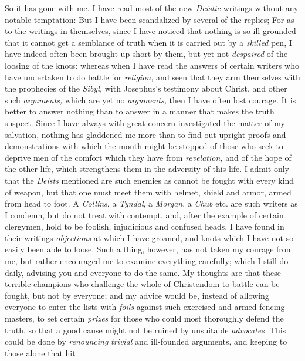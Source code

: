 \documentclass[12pt,a4paper,openany]{book}
\newcommand{\opage}[1]{\marginnote{\footnotesize\textit{[#1]}}}
\begin{document}
So it has gone with me. I have read most of the new \textit{Deistic} writings
without any notable temptation: But I have been scandalized by several of the
replies; For as to the writings in themselves, since I have noticed that nothing
is so ill-grounded that it cannot get a semblance of truth when it is carried
out by a \textit{skilled} pen, I have indeed often been brought up short by them,
but yet not \textit{despaired} of the loosing of the knots: whereas when I have
read the answers of certain writers who have undertaken to do battle for
\textit{religion,} and seen that they arm themselves with the prophecies of the
\textit{Sibyl,} with Josephus's testimony about Christ, and other such
\textit{arguments,} which are yet no \textit{arguments,} then I have often lost
courage. It is better to answer nothing than to answer in a manner that makes
the truth suspect. Since I have always with great concern investigated the matter
of my salvation, nothing has gladdened me more than to find out upright proofs
and demonstrations with which the mouth might be stopped of those who seek to
deprive men of the comfort which they have from \textit{revelation,} and of the
hope of the other life, which strengthens them in the adversity of this life. I
admit only that the \textit{Deists} mentioned are such enemies as cannot be
fought with every kind of weapon, but that one must meet them with helmet,
shield and armor, armed from head to foot. A \textit{Collins}, a
\textit{Tyndal}, a \textit{Morgan}, a \textit{Chub} etc. are such writers as I
condemn, but do not treat with contempt, and, after the example of certain
clergymen, hold to be foolish, injudicious and confused heads. I have found in
their writings \textit{objections} at which I have groaned, and knots which I
have not so easily been able to loose. Such a thing, however, has not
\setcounter{footnote}{0}%
\opage{12}taken my courage from me, but rather encouraged me to examine everything
carefully; which I still do daily, advising you and everyone to do the same. My
thoughts are that these terrible champions who challenge the whole of
Christendom to battle can be fought, but not by everyone; and my advice would be,
instead of allowing everyone to enter the lists with \textit{foils} against such
exercised and armed fencing-masters, to set certain \textit{prizes} for those who
could most thoroughly defend the truth, so that a good cause might not be ruined
by unsuitable \textit{advocates.} This could be done by \textit{renouncing}
\textit{trivial} and ill-founded arguments, and keeping to those alone that hit
\end{document}
